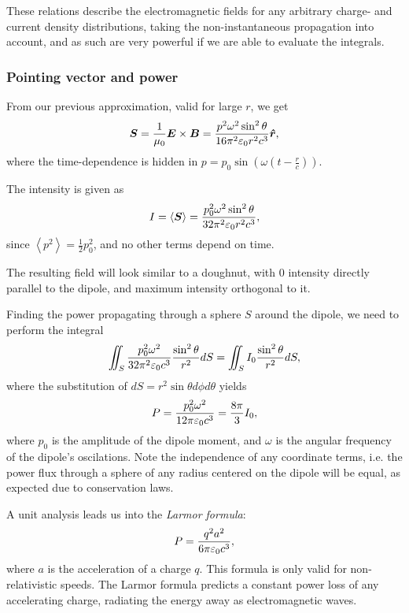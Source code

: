         These relations describe the electromagnetic fields for any arbitrary charge- and current density distributions, 
        taking the non-instantaneous propagation into account,
        and as such are very powerful if we are able to evaluate the integrals.
    
    \subsubsection*{Pointing vector and power}
        From our previous approximation, valid for large $r$, we get
        \begin{equation}
            \vec{S} = \frac{1}{\mu_0}\E\times\B = \frac{p^2\omega^2\sin^2\theta}{16\pi^2\e r^2 c^3}\hat{r},
        \end{equation}
        where the time-dependence is hidden in $p = p_0\sin\left(\omega\left(t - \frac{r}{c}\right)\right)$.
    
        The intensity is given as 
        \begin{equation}
            I = \left<\bm{S}\right> = \frac{p_0^2\omega^2\sin^2\theta}{32\pi^2\varepsilon_0 r^2 c^3},
        \end{equation}
        since $\left<p^2\right> = \frac{1}{2}p_0^2$, and no other terms depend on time. 

        The resulting field will look similar to a doughnut, with $0$ intensity directly parallel to the dipole, and maximum intensity orthogonal to it.

        Finding the power propagating through a sphere $S$ around the dipole, we need to perform the integral 
        \begin{equation*}
            \iint_S \frac{p_0^2\omega^2}{32\pi^2\varepsilon_0 c^3} \frac{\sin^2\theta}{r^2} dS = \iint_S I_0\frac{\sin^2\theta}{r^2} dS,
        \end{equation*}
        where the substitution of $dS = r^2\sin\theta d\phi d\theta$ yields 
        \begin{equation}
            P = \frac{p_0^2\omega^2}{12\pi\varepsilon_0 c^3} = \frac{8\pi}{3}I_0,
        \end{equation}
        where $p_0$ is the amplitude of the dipole moment, and $\omega$ is the angular frequency of the dipole's oscilations.
        Note the independence of any coordinate terms, i.e. the power flux through a sphere of any radius centered on the dipole will be equal, 
        as expected due to conservation laws.

        A unit analysis leads us into the \textit{Larmor formula}:
        \begin{equation}
            P = \frac{q^2a^2}{6\pi\varepsilon_0 c^3},
        \end{equation}
        where $a$ is the acceleration of a charge $q$. This formula is only valid for non-relativistic speeds. 
        The Larmor formula predicts a constant power loss of any accelerating charge, radiating the energy away as electromagnetic waves.

